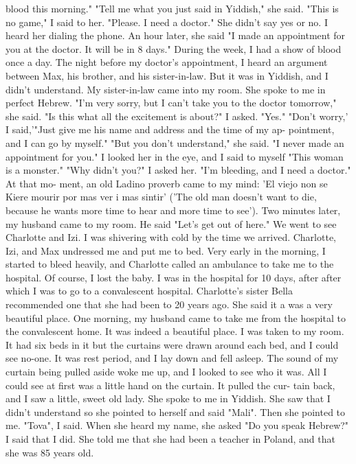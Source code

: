 blood this morning."
"Tell me what you just said in Yiddish," she said.
"This is no game," I said to her.
"Please.
I need a doctor."
She didn't say yes or no.
I heard her dialing the phone.
An hour later, she 
said "I made an appointment for you at the doctor.
It will be in 8 days."
During the week, I had a show of blood once a day.
The night before my doctor's 
appointment, I heard an argument between Max, his brother, and his sister-in-law.
But 
it was in Yiddish, and I didn't understand.
My sister-in-law came into my room.
She 
spoke to me in perfect Hebrew.
"I'm very sorry, but I can't take you to the doctor tomorrow," she said.
"Is this what all the excitement is about?"
I asked.
"Yes."
"Don't worry,' I said,'"Just give me his name and address and the time of my ap-
pointment, and I can go by myself."
"But you don't understand," she said.
"I never made an appointment for you."
I looked her in the eye, and I said to myself "This woman is a monster."
"Why didn't you?"
I asked her.
"I'm bleeding, and I need a doctor."
At that mo-
ment, an old Ladino proverb came to my mind: 'El viejo non se Kiere mourir por mas ver 
i mas sintir' ('The old man doesn't want to die, because he wants more time to hear 
and more time to see').
Two minutes later, my husband came to my room.
He said "Let's get out of here."
We went to see Charlotte and Izi.
I was shivering with cold by the time we arrived.
Charlotte, Izi, and Max undressed me and put me to bed.
Very early in the morning, 
I started to bleed heavily, and Charlotte called an ambulance to take me to the 
hospital.
Of course, I lost the baby.
I was in the hospital for 10 days, after after which I was to go to a convalescent
hospital.
Charlotte's sister Bella recommended one that she had been to 20 years ago.
She said it a was a very beautiful place.
One morning, my husband came to take me from
the hospital to the convalescent home.
It was indeed a beautiful place.
I was taken to my room.
It had six beds in it 
but the curtains were drawn around each bed, and I could see no-one.
It was rest period, and I lay down and fell asleep.
The sound of my curtain being pulled aside woke me up, and I looked to see who it 
was.
All I could see at first was a little hand on the curtain.
It pulled the cur-
tain back, and I saw a little, sweet old lady.
She spoke to me in Yiddish.
She saw 
that I didn't understand so she pointed to herself and said "Mali".
Then she pointed 
to me.
"Tova", I said.
When she heard my name, she asked "Do you speak Hebrew?"
I said that I did.
She told me that she had been a teacher in Poland, and that she was 85 years old.
